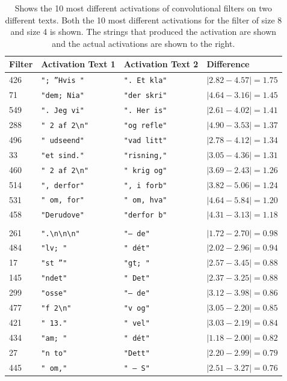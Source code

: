 \begin{table}
    \begin{tabular}{llll}
        \textbf{Filter} & \textbf{Activation Text 1} &
        \textbf{Activation Text 2} & \textbf{Difference} \\
        \hline
        426 & \verb'"; ”Hvis "'  & \verb'". Et kla"' & $|2.82 - 4.57| = 1.75$ \\
        71  & \verb'"dem; Nia"'  & \verb'"der skri"' & $|4.64 - 3.16| = 1.45$ \\
        549 & \verb'". Jeg vi"'  & \verb'". Her is"' & $|2.61 - 4.02| = 1.41$ \\
        288 & \verb'" 2 af 2\n"' & \verb'"og refle"' & $|4.90 - 3.53| = 1.37$ \\
        496 & \verb'" udseend"'  & \verb'"vad litt"' & $|2.78 - 4.12| = 1.34$ \\
        33  & \verb'"et sind."'  & \verb'"risning,"' & $|3.05 - 4.36| = 1.31$ \\
        460 & \verb'" 2 af 2\n"' & \verb'" krig og"' & $|3.69 - 2.43| = 1.26$ \\
        514 & \verb'", derfor"'  & \verb'", i forb"' & $|3.82 - 5.06| = 1.24$ \\
        531 & \verb'" om, for"'  & \verb'" om, hva"' & $|4.64 - 5.84| = 1.20$ \\
        458 & \verb'"Derudove"'  & \verb'"derfor b"' & $|4.31 - 3.13| = 1.18$ \\
        \\
        261 & \verb'".\n\n\n"'   & \verb'"– de"'     & $|1.72 - 2.70| = 0.98$ \\
        484 & \verb'"lv; "'      & \verb'" dét"'     & $|2.02 - 2.96| = 0.94$ \\
        17  & \verb'"st ”"'      & \verb'"gt; "'     & $|2.57 - 3.45| = 0.88$ \\
        145 & \verb'"ndet"'      & \verb'" Det"'     & $|2.37 - 3.25| = 0.88$ \\
        299 & \verb'"osse"'      & \verb'"– de"'     & $|3.12 - 3.98| = 0.86$ \\
        477 & \verb'"f 2\n"'     & \verb'"v og"'     & $|3.05 - 2.20| = 0.85$ \\
        421 & \verb'" 13."'      & \verb'" vel"'     & $|3.03 - 2.19| = 0.84$ \\
        434 & \verb'"am; "'      & \verb'" dét"'     & $|1.18 - 2.00| = 0.82$ \\
        27  & \verb'"n to"'      & \verb'"Dett"'     & $|2.20 - 2.99| = 0.79$ \\
        445 & \verb'" om,"'      & \verb'" – S"'     & $|2.51 - 3.27| = 0.76$ \\
    \end{tabular}
    \caption{Shows the 10 most different activations of convolutional filters on
        two different texts. Both the 10 most different activations for the
        filter of size 8 and size 4 is shown. The strings that produced the
        activation are shown and the actual activations are shown to the right.}
    \label{tab:teacher_feedback_output}
\end{table}

